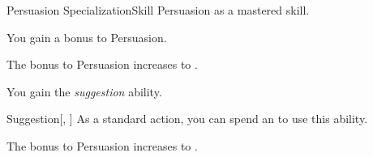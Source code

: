     \begin{feat}{Persuasion Specialization}{Skill}
        \featpre Persuasion as a mastered skill.

         You gain a  bonus to Persuasion.

        \ff[2]{}

         The bonus to Persuasion increases to .

         You gain the \textit{suggestion} ability.
        \begin{ability}{Suggestion}[, ]
            As a standard action, you can spend an  to use this ability.
        \end{ability}

         The bonus to Persuasion increases to .
    \end{feat}

